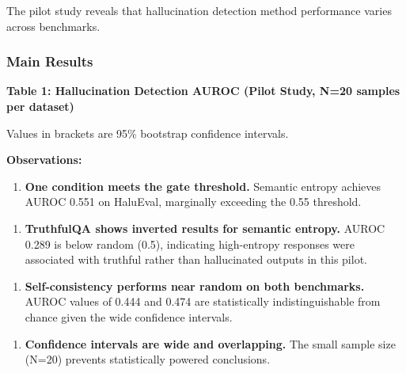 
The pilot study reveals that hallucination detection method performance varies across benchmarks.

\subsubsection{Main Results}

\textbf{Table 1: Hallucination Detection AUROC (Pilot Study, N=20 samples per dataset)}

\begin{table}[htbp]
\centering
{}
\end{table}

Values in brackets are 95\% bootstrap confidence intervals.

\textbf{Observations:}

\begin{enumerate}
\item \textbf{One condition meets the gate threshold.} Semantic entropy achieves AUROC 0.551 on HaluEval, marginally exceeding the 0.55 threshold.
\end{enumerate}

\begin{enumerate}
\item \textbf{TruthfulQA shows inverted results for semantic entropy.} AUROC 0.289 is below random (0.5), indicating high-entropy responses were associated with truthful rather than hallucinated outputs in this pilot.
\end{enumerate}

\begin{enumerate}
\item \textbf{Self-consistency performs near random on both benchmarks.} AUROC values of 0.444 and 0.474 are statistically indistinguishable from chance given the wide confidence intervals.
\end{enumerate}

\begin{enumerate}
\item \textbf{Confidence intervals are wide and overlapping.} The small sample size (N=20) prevents statistically powered conclusions.
\end{enumerate}

